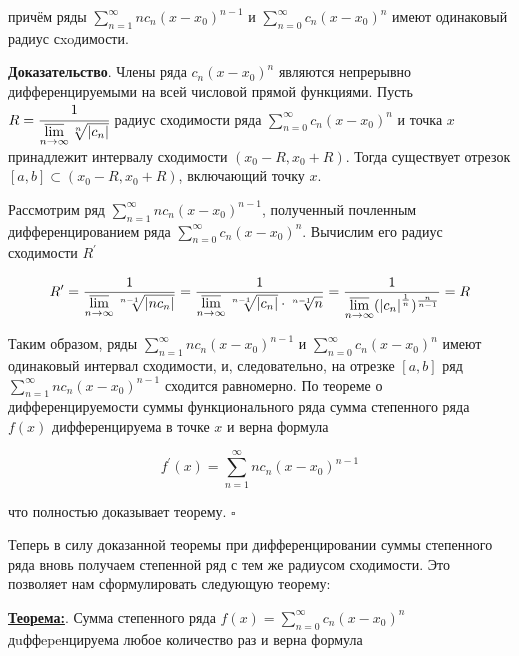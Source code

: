 \documentclass[a4paper,12pt]{article} %
\begin{document}
причём ряды $\sum\limits_{n=1}^{\infty} n c_{n}\left(x-x_{0}\right)^{n-1}$ и $\sum\limits_{n=0}^{\infty} c_{n}\left(x-x_{0}\right)^{n}$ имеют одинаковый радиус сxoдимости.

\textbf{Доказательство}. Члены ряда $c_{n}\left(x-x_{0}\right)^{n}$ являются непрерывно дифференцируемыми на всей числовой прямой функциями. Пусть $R=\cfrac{1}{\varlimsup\limits_{n \rightarrow \infty} \sqrt[n]{\left|c_{n}\right|}}$ радиус сходимости ряда $\sum\limits_{n=0}^{\infty} c_{n}\left(x-x_{0}\right)^{n}$ и точка $x$ принадлежит интервалу сходимости $\left(x_{0}-R, x_{0}+R\right) .$ Тогда существует отрезок $[a, b] \subset\left(x_{0}-R, x_{0}+R\right)$, включающий точку $x .$

Рассмотрим ряд $\sum\limits_{n=1}^{\infty} n c_{n}\left(x-x_{0}\right)^{n-1}$, полученный почленным дифференцированием ряда $\sum\limits_{n=0}^{\infty} c_{n}\left(x-x_{0}\right)^{n} .$ Вычислим его радиус сходимости $R^{\prime}$

\begin{equation*}
R^{\prime}=\frac{1}{\varlimsup \limits_{n \rightarrow \infty} \sqrt[n-1]{\left|n c_{n}\right|}} = \frac{1}{\varlimsup \limits_{n \rightarrow \infty} \sqrt[n-1]{\left|c_{n}\right|}\cdot \sqrt[n-1]{n}} = \frac{1}{\varlimsup \limits_{n \rightarrow \infty}(\left|c_{n}\right|^{\frac{1}{n}})^{\frac{n}{n-1}}}=R
\end{equation*}

Таким образом, ряды $\sum\limits_{n=1}^{\infty} n c_{n}\left(x-x_{0}\right)^{n-1}$ и $\sum\limits_{n=0}^{\infty} c_{n}\left(x-x_{0}\right)^{n}$ имеют одинаковый интервал сходимости, и, следовательно, на отрезке $[a, b]$ ряд $\sum\limits_{n=1}^{\infty} n c_{n}\left(x-x_{0}\right)^{n-1}$ сходится равномерно. По теореме о дифференцируемости суммы функционального ряда сумма степенного ряда $f(x)$ дифференцируема в точке $x$ и верна формула

\begin{equation*}
f^{\prime}(x)=\sum\limits_{n=1}^{\infty} n c_{n}\left(x-x_{0}\right)^{n-1}
\end{equation*}

что полностью доказывает теорему. $\square$

Теперь в силу доказанной теоремы при дифференцировании суммы степенного ряда вновь получаем степенной ряд с тем же радиусом сходимости. Это позволяет нам сформулировать
следующую теорему:

\underline{\textbf{Теорема:}}. Сумма степенного ряда $f(x)=\sum\limits_{n=0}^{\infty} c_{n}\left(x-x_{0}\right)^{n}$ дuффepeнцируема любое количество раз и верна формула
\end{document}
